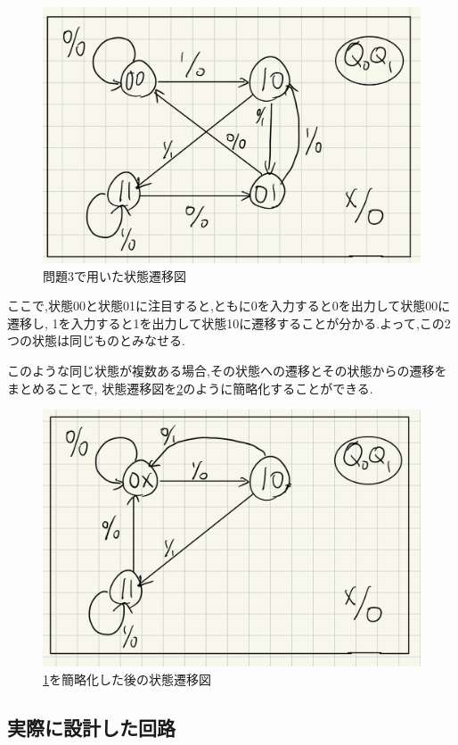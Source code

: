 \documentclass[autodetect-engine, dvi=dvipdfmx, 10pt, a4paper, ja=standard]{bxjsarticle}
\begin{document}
\begin{figure}[H]
	\centering
	\includegraphics[width=0.8\columnwidth]{asset/ex3_state.png}
	\caption{問題3で用いた状態遷移図}
	\label{fig:ex3-state}
\end{figure}

ここで,状態00と状態01に注目すると,ともに0を入力すると0を出力して状態00に遷移し,
1を入力すると1を出力して状態10に遷移することが分かる.よって,この2つの状態は同じものとみなせる.

このような同じ状態が複数ある場合,その状態への遷移とその状態からの遷移をまとめることで,
状態遷移図を\ref{fig:ex3-state-refine}のように簡略化することができる.

\begin{figure}[H]
	\centering
	\includegraphics[width=0.8\columnwidth]{asset/ex3_state_refine.png}
	\caption{\ref{fig:ex3-state}を簡略化した後の状態遷移図}
	\label{fig:ex3-state-refine}
\end{figure}

\subsection{実際に設計した回路}
\end{document}
